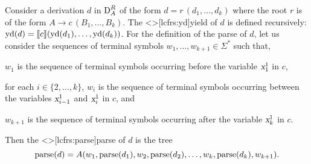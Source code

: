 \documentclass[../document.tex]{subfiles}
\begin{document}
    \begin{definition}
        Consider a derivation \(d\) in \(\operatorname{D}^R_A\) of the form \(d = r\,(d_1, \ldots, d_k)\) where the root \(r\) is of the form \(A \to c\,(B_1, \ldots, B_k)\).
        The <\lcfrs>[lcfrs:yd]{yield} of \(d\) is defined recursively: \(\operatorname{yd}(d) = \llbracket c\rrbracket(\operatorname{yd}(d_1), \ldots, \operatorname{yd}(d_k))\).
        For the definition of the parse of \(d\), let us consider the sequences of terminal symbols \(w_1, \ldots, w_{k+1} \in \varSigma^*\) such that,
        \begin{compactitem}
            \item \(w_1\) is the sequence of terminal symbols occurring before the variable \(\textsl{x}_1^1\) in \(c\),
            \item for each \(i \in \{2, \ldots, k\}\), \(w_i\) is the sequence of terminal symbols occurring between the variables \(\textsl{x}_{i-1}^1\) and \(\textsl{x}_i^1\) in \(c\), and
            \item \(w_{k+1}\) is the sequence of terminal symbols occurring after the variable \(\textsl{x}_k^1\) in \(c\).
        \end{compactitem}
        Then the <\lcfrs>[lcfrs:parse]{parse} of \(d\) is the tree \[
            \operatorname{parse}(d) = A(w_1, \operatorname{parse}(d_1), w_2, \operatorname{parse}(d_2), \ldots, w_k, \operatorname{parse}(d_k), w_{k+1}) \text{.}
        \]
    \end{definition}
\end{document}
